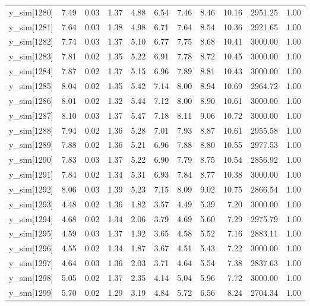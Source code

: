 \begin{table}[ht]
\begin{tabular}{rrrrrrrrrrr}
  y\_sim[1280] & 7.49 & 0.03 & 1.37 & 4.88 & 6.54 & 7.46 & 8.46 & 10.16 & 2951.25 & 1.00 \\ 
  y\_sim[1281] & 7.64 & 0.03 & 1.38 & 4.98 & 6.71 & 7.64 & 8.54 & 10.36 & 2921.65 & 1.00 \\ 
  y\_sim[1282] & 7.74 & 0.03 & 1.37 & 5.10 & 6.77 & 7.75 & 8.68 & 10.41 & 3000.00 & 1.00 \\ 
  y\_sim[1283] & 7.81 & 0.02 & 1.35 & 5.22 & 6.91 & 7.78 & 8.72 & 10.45 & 3000.00 & 1.00 \\ 
  y\_sim[1284] & 7.87 & 0.02 & 1.37 & 5.15 & 6.96 & 7.89 & 8.81 & 10.43 & 3000.00 & 1.00 \\ 
  y\_sim[1285] & 8.04 & 0.02 & 1.35 & 5.42 & 7.14 & 8.00 & 8.94 & 10.69 & 2964.72 & 1.00 \\ 
  y\_sim[1286] & 8.01 & 0.02 & 1.32 & 5.44 & 7.12 & 8.00 & 8.90 & 10.61 & 3000.00 & 1.00 \\ 
  y\_sim[1287] & 8.10 & 0.03 & 1.37 & 5.47 & 7.18 & 8.11 & 9.06 & 10.72 & 3000.00 & 1.00 \\ 
  y\_sim[1288] & 7.94 & 0.02 & 1.36 & 5.28 & 7.01 & 7.93 & 8.87 & 10.61 & 2955.58 & 1.00 \\ 
  y\_sim[1289] & 7.88 & 0.02 & 1.36 & 5.21 & 6.96 & 7.88 & 8.80 & 10.55 & 2977.53 & 1.00 \\ 
  y\_sim[1290] & 7.83 & 0.03 & 1.37 & 5.22 & 6.90 & 7.79 & 8.75 & 10.54 & 2856.92 & 1.00 \\ 
  y\_sim[1291] & 7.84 & 0.02 & 1.34 & 5.31 & 6.93 & 7.84 & 8.77 & 10.38 & 3000.00 & 1.00 \\ 
  y\_sim[1292] & 8.06 & 0.03 & 1.39 & 5.23 & 7.15 & 8.09 & 9.02 & 10.75 & 2866.54 & 1.00 \\ 
  y\_sim[1293] & 4.48 & 0.02 & 1.36 & 1.82 & 3.57 & 4.49 & 5.39 & 7.20 & 3000.00 & 1.00 \\ 
  y\_sim[1294] & 4.68 & 0.02 & 1.34 & 2.06 & 3.79 & 4.69 & 5.60 & 7.29 & 2975.79 & 1.00 \\ 
  y\_sim[1295] & 4.59 & 0.03 & 1.37 & 1.92 & 3.65 & 4.58 & 5.52 & 7.16 & 2883.11 & 1.00 \\ 
  y\_sim[1296] & 4.55 & 0.02 & 1.34 & 1.87 & 3.67 & 4.51 & 5.43 & 7.22 & 3000.00 & 1.00 \\ 
  y\_sim[1297] & 4.64 & 0.03 & 1.36 & 2.03 & 3.71 & 4.64 & 5.54 & 7.38 & 2837.63 & 1.00 \\ 
  y\_sim[1298] & 5.05 & 0.02 & 1.37 & 2.35 & 4.14 & 5.04 & 5.96 & 7.72 & 3000.00 & 1.00 \\ 
  y\_sim[1299] & 5.70 & 0.02 & 1.29 & 3.19 & 4.84 & 5.72 & 6.56 & 8.24 & 2704.34 & 1.00 \\ 

\end{tabular}
\end{table}
